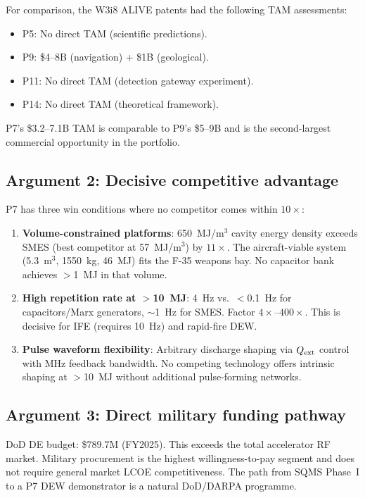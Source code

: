 \documentclass[11pt]{article}
\begin{document}
For comparison, the W3i8 ALIVE patents had the following TAM assessments:
\begin{itemize}[nosep]
  \item P5: No direct TAM (scientific predictions).
  \item P9: \$4--8B (navigation) + \$1B (geological).
  \item P11: No direct TAM (detection gateway experiment).
  \item P14: No direct TAM (theoretical framework).
\end{itemize}

P7's \$3.2--7.1B TAM is comparable to P9's \$5--9B and is the
second-largest commercial opportunity in the portfolio.

\subsection{Argument 2: Decisive competitive advantage}

P7 has three win conditions where no competitor comes within $10\times$:

\begin{enumerate}
\item \textbf{Volume-constrained platforms}: 650~MJ/m$^3$ cavity energy
  density exceeds SMES (best competitor at 57~MJ/m$^3$) by $11\times$.
  The aircraft-viable system (5.3~m$^3$, 1550~kg, 46~MJ) fits the F-35
  weapons bay. No capacitor bank achieves $>$1~MJ in that volume.

\item \textbf{High repetition rate at $>$10~MJ}: 4~Hz vs.\ $<$0.1~Hz for
  capacitors/Marx generators, $\sim$1~Hz for SMES. Factor $4\times$--$400\times$.
  This is decisive for IFE (requires 10~Hz) and rapid-fire DEW.

\item \textbf{Pulse waveform flexibility}: Arbitrary discharge shaping via
  $Q_{\rm ext}$ control with MHz feedback bandwidth. No competing technology
  offers intrinsic shaping at $>$10~MJ without additional pulse-forming
  networks.
\end{enumerate}

\subsection{Argument 3: Direct military funding pathway}

DoD DE budget: \$789.7M (FY2025). This exceeds the total accelerator
RF market. Military procurement is the highest willingness-to-pay
segment and does not require general market LCOE competitiveness.
The path from SQMS Phase~I to a P7 DEW demonstrator is a natural
DoD/DARPA programme.
\end{document}
